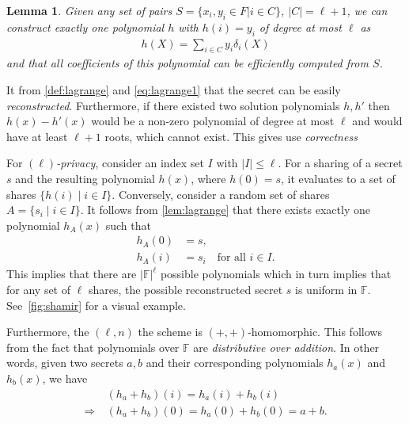 \documentclass[twoside,11pt]{report}
\theoremstyle{definition}
\theoremstyle{plain}
\newtheorem{lemma}{Lemma}[section]
\begin{document}
\begin{lemma}\label{lem:lagrange}
  Given any set of pairs $S = \{x_i, y_i \in F| i \in C\}$, $|C| = \ell + 1$, we can construct exactly one polynomial $h$ with $h(i) = y_i$ of degree at most $\ell$ as
  \begin{align*}
    h(X) = \sum_{i \in C} y_i \delta_i(X)
  \end{align*}
  \noindent and that all coefficients of this polynomial can be efficiently computed from $S$.
\end{lemma}

It from \autoref{def:lagrange} and \autoref{eq:lagrange1} that the secret can be easily \textit{reconstructed}. Furthermore, if there existed two solution polynomials $h, h'$ then $h(x) - h'(x)$ would be a non-zero polynomial of degree at most $\ell$ and would have at least $\ell + 1$ roots, which cannot exist. This gives use \textit{correctness}

For \textit{$(\ell)$-privacy}, consider an index set $I$ with $|I| \leq \ell$. For a sharing of a secret $s$ and the resulting polynomial $h(x)$, where $h(0) = s$, it evaluates to a set of shares $\{h(i) \mid i \in I\}$.
Conversely, consider a random set of shares $A = \{s_i \mid i \in I\}$. It follows from \autoref{lem:lagrange} that there exists exactly one polynomial $h_A(x)$ such that
\begin{align*}
  h_A(0) & = s,                                 \\
  h_A(i) & = s_i \quad \text{for all } i \in I.
\end{align*}
This implies that there are $|\mathbb{F}|^\ell$ possible polynomials which in turn implies that for any set of $\ell$ shares, the possible reconstructed secret $s$ is uniform in $\mathbb{F}$. See~\autoref{fig:shamir} for a visual example.

Furthermore, the $(\ell, n)$ the scheme is $(+, +)$-homomorphic. This follows from the fact that polynomials over $\mathbb{F}$ are \textit{distributive over addition}. In other words, given two secrets $a, b$ and their corresponding polynomials $h_a(x)$ and $h_b(x)$, we have
\begin{align*}
                & (h_a + h_b)(i) = h_a(i) + h_b(i)          \\
  \Rightarrow\  & (h_a + h_b)(0) = h_a(0) + h_b(0) = a + b.
\end{align*}
\end{document}
